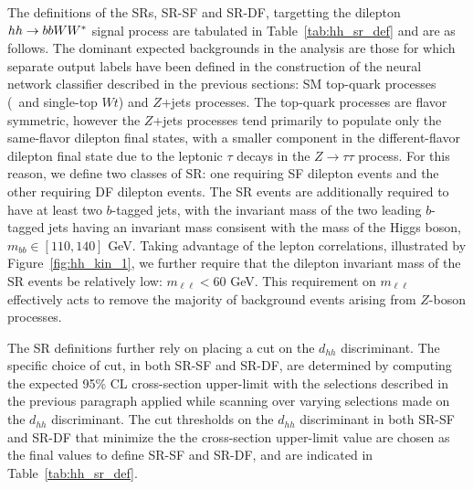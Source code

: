 The definitions of the SRs, SR-SF and SR-DF, targetting the dilepton $hh \rightarrow bbWW^*$ signal process are tabulated
in Table~\ref{tab:hh_sr_def} and are as follows.
The dominant expected backgrounds in the analysis are those for which separate output labels
have been defined in the construction of the neural network classifier described in the previous sections:
SM top-quark processes (\ttbar~and single-top $Wt$) and $Z$+jets processes.
The top-quark processes are flavor symmetric, however the $Z$+jets processes tend primarily to populate
only the same-flavor dilepton final states, with a smaller component in the different-flavor dilepton
final state due to the leptonic $\tau$ decays in the $Z\rightarrow \tau \tau$ process.
For this reason, we define two classes of SR: one requiring SF dilepton events and the
other requiring DF dilepton events.
The SR events are additionally required to have at least two $b$-tagged jets, with
the invariant mass of the two leading $b$-tagged jets having an invariant mass consisent with the
mass of the Higgs boson, $m_{bb} \in [110, 140]$ GeV.
Taking advantage of the lepton correlations, illustrated by Figure~\ref{fig:hh_kin_1},
we further require that the dilepton invariant mass of the SR events be relatively low: $m_{\ell \ell} < 60$ GeV.
This requirement on $m_{\ell \ell}$ effectively acts to remove the majority of background events
arising from $Z$-boson processes.

The SR definitions further rely on placing a cut on the $d_{hh}$ discriminant.
The specific choice of cut, in both SR-SF and SR-DF, are determined by computing the expected 95\% CL cross-section upper-limit
with the selections described in the previous paragraph applied while scanning over varying selections
made on the $d_{hh}$ discriminant.
The cut thresholds on the $d_{hh}$ discriminant in both SR-SF and SR-DF that minimize the the cross-section
upper-limit value are chosen as the final values to define SR-SF and SR-DF, and are indicated in Table~\ref{tab:hh_sr_def}.


